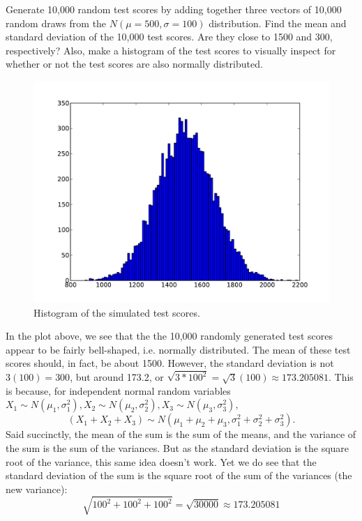 \begin{problem}
Generate 10,000 random test scores by adding together three vectors of 10,000 random draws from the $N(\mu=500,\sigma=100)$ distribution. 
Find the mean and standard deviation of the 10,000 test scores. 
Are they close to 1500 and 300, respectively? 
Also, make a histogram of the test scores to visually inspect for whether or not the test scores are also normally distributed.
\label{prob:randomTests}
\end{problem}

\begin{figure}[h]
\includegraphics[width=\textwidth]{scorehist.pdf}
\caption{Histogram of the simulated test scores.}
\end{figure}
In the plot above, we see that the the 10,000 randomly generated test scores appear to be fairly bell-shaped, i.e. normally distributed. 
The mean of these test scores should, in fact, be about 1500. 
However, the standard deviation is not $3(100) = 300$, but around 173.2, or $\sqrt{3*100^2}=\sqrt{3}(100) \approx 173.205081$. 
This is because, for independent normal random variables $X_1 \sim N(\mu_1,\sigma^2_1), X_2 \sim N(\mu_2,\sigma^2_2),X_3 \sim N(\mu_3,\sigma^2_3),$
\[ (X_1 +X_2 +X_3) \sim N(\mu_1+\mu_2+\mu_3, \sigma^2_1+\sigma^2_2+\sigma^2_3). \]
Said succinctly, the mean of the sum is the sum of the means, and the variance of the sum is the sum of the variances. 
But as the standard deviation is the square root of the variance, this same idea doesn't work. 
Yet we do see that the standard deviation of the sum is the square root of the sum of the variances (the new variance):
\[ \sqrt{100^2+100^2+100^2} = \sqrt{30000} \approx 173.205081 \]

